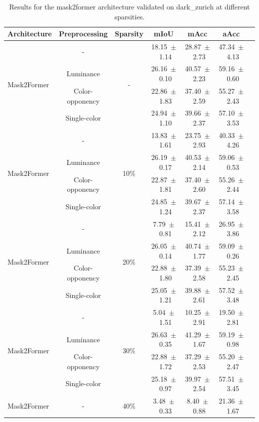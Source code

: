 \begin{table}[h]
\centering
\caption{Results for the mask2former architecture validated on dark_zurich at different sparsities.}
\begin{tabular}{@{}lccc ccc@{}}
\toprule
Architecture & Preprocessing & Sparsity & mIoU & mAcc & aAcc \\
\midrule

\multirow{4}{*}{Mask2Former} & - & \multirow{4}{*}{-} & 18.15~$\pm$~1.14 & 28.87~$\pm$~2.73 & 47.34~$\pm$~4.13 \\
& Luminance & & 26.16~$\pm$~0.10 & 40.57~$\pm$~2.23 & 59.16~$\pm$~0.60 \\
& Color-opponency & & 22.86~$\pm$~1.83 & 37.40~$\pm$~2.59 & 55.27~$\pm$~2.43 \\
& Single-color & & 24.94~$\pm$~1.10 & 39.66~$\pm$~2.37 & 57.10~$\pm$~3.53 \\
\midrule
\multirow{4}{*}{Mask2Former} & - & \multirow{4}{*}{10\%} & 13.83~$\pm$~1.61 & 23.75~$\pm$~2.93 & 40.33~$\pm$~4.26 \\
& Luminance & & 26.19~$\pm$~0.17 & 40.53~$\pm$~2.14 & 59.06~$\pm$~0.53 \\
& Color-opponency & & 22.87~$\pm$~1.81 & 37.40~$\pm$~2.60 & 55.26~$\pm$~2.44 \\
& Single-color & & 24.85~$\pm$~1.24 & 39.67~$\pm$~2.37 & 57.14~$\pm$~3.58 \\
\midrule
\multirow{4}{*}{Mask2Former} & - & \multirow{4}{*}{20\%} & 7.79~$\pm$~0.81 & 15.41~$\pm$~2.12 & 26.95~$\pm$~3.86 \\
& Luminance & & 26.05~$\pm$~0.14 & 40.74~$\pm$~1.77 & 59.09~$\pm$~0.26 \\
& Color-opponency & & 22.88~$\pm$~1.80 & 37.39~$\pm$~2.58 & 55.23~$\pm$~2.45 \\
& Single-color & & 25.05~$\pm$~1.21 & 39.88~$\pm$~2.61 & 57.52~$\pm$~3.48 \\
\midrule
\multirow{4}{*}{Mask2Former} & - & \multirow{4}{*}{30\%} & 5.04~$\pm$~1.51 & 10.25~$\pm$~2.91 & 19.50~$\pm$~2.81 \\
& Luminance & & 26.63~$\pm$~0.35 & 41.29~$\pm$~1.67 & 59.19~$\pm$~0.98 \\
& Color-opponency & & 22.88~$\pm$~1.72 & 37.29~$\pm$~2.53 & 55.20~$\pm$~2.47 \\
& Single-color & & 25.18~$\pm$~0.97 & 39.97~$\pm$~2.54 & 57.51~$\pm$~3.45 \\
\midrule
\multirow{4}{*}{Mask2Former} & - & \multirow{4}{*}{40\%} & 3.48~$\pm$~0.33 & 8.40~$\pm$~0.88 & 21.36~$\pm$~1.67 \\

\end{tabular}
\end{table}

